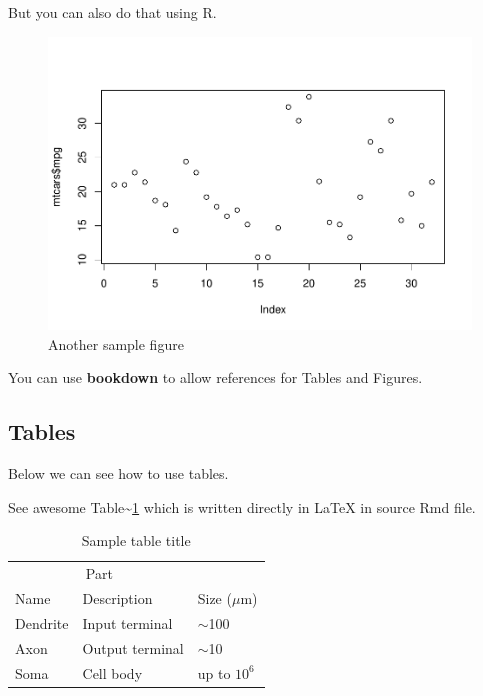 \documentclass{article}
\newenvironment{Shaded}{\begin{snugshade}}{\end{snugshade}}
\newcommand{\FunctionTok}[1]{\textcolor[rgb]{0.00,0.00,0.00}{#1}}
\newcommand{\NormalTok}[1]{#1}
\newcommand{\SpecialCharTok}[1]{\textcolor[rgb]{0.00,0.00,0.00}{#1}}
\begin{document}
But you can also do that using R.

\begin{Shaded}
\end{Shaded}

\begin{figure}
\centering
\includegraphics{paper_files/figure-latex/fig2-1.pdf}
\caption{Another sample figure}
\end{figure}

You can use \textbf{bookdown} to allow references for Tables and
Figures.

\hypertarget{tables}{%
\subsection{Tables}\label{tables}}

Below we can see how to use tables.

See awesome Table\textasciitilde{}\ref{tab:table} which is written
directly in LaTeX in source Rmd file.

\begin{table}
 \caption{Sample table title}
  \centering
  \begin{tabular}{lll}
    \toprule
    \multicolumn{2}{c}{Part}                   \\
    \cmidrule(r){1-2}
    Name     & Description     & Size ($\mu$m) \\
    \midrule
    Dendrite & Input terminal  & $\sim$100     \\
    Axon     & Output terminal & $\sim$10      \\
    Soma     & Cell body       & up to $10^6$  \\
    \bottomrule
  \end{tabular}
  \label{tab:table}
\end{table}
\end{document}
